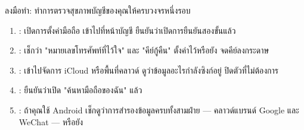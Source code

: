 \begin{tcbpractice}{ลงมือทำ: ทำการตรวจสุขภาพบัญชีของคุณให้ครบวงจรหนึ่งรอบ}
\begin{enumerate}
  \item : เปิดการตั้งค่ามือถือ เข้าไปที่หน้าบัญชี ยืนยันว่าเปิดการยืนยันสองขั้นแล้ว
  \item : เช็กว่า "หมายเลขโทรศัพท์ที่ไว้ใจ" และ "คีย์กู้คืน" ตั้งค่าไว้หรือยัง จดคีย์ลงกระดาษ
  \item : เข้าไปจัดการ iCloud หรือพื้นที่คลาวด์ ดูว่าข้อมูลอะไรกำลังซิงก์อยู่ ปิดตัวที่ไม่ต้องการ
  \item : ยืนยันว่าเปิด "ค้นหามือถือของฉัน" แล้ว
  \item : ถ้าคุณใช้ Android เช็กดูว่าการสำรองข้อมูลครบทั้งสามฝ่าย — คลาวด์แบรนด์ Google และ WeChat — หรือยัง
\end{enumerate}

\end{tcbpractice}
